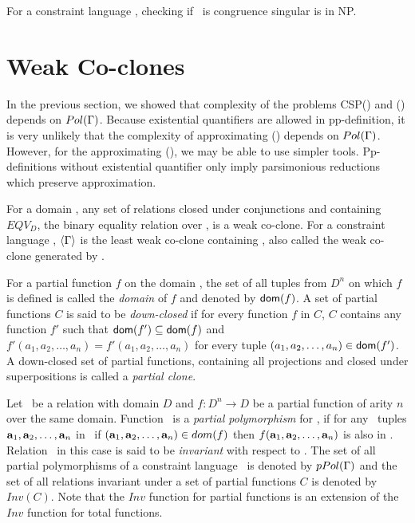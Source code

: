 \begin{theorem} 
For a constraint language \mrelset, checking if \mrelset\ is congruence singular is in NP.
\end{theorem}

\section{Weak Co-clones}
In the previous section, we showed that 
complexity of the problems CSP(\mrelset) and \ccsp(\mrelset) depends on \(Pol(\Gamma)\)\@.
Because existential quantifiers are allowed in pp-definition,
it is very unlikely that the complexity of approximating \ccsp(\mrelset) depends on \(Pol(\Gamma)\).
However, for the approximating \ccsp(\mrelset), we may be able to use
simpler tools. Pp-definitions without existential quantifier only imply
parsimonious reductions which preserve approximation.

For a domain \mD, any set of relations closed under conjunctions and
containing \(EQV_D\), the binary equality relation over \mD,
is a weak co-clone. For a constraint language \mrelset, 
\(\langle \Gamma \rangle\) is the least weak co-clone containing \mrelset,
also called the weak co-clone generated by \mrelset\@.

For a partial function \(f\) on the domain \mD,
the set of all tuples from \(D^n\) on which \(f\) is
defined is called the \emph{domain} of \(f\) and denoted by \({\sf dom}(f)\).
A set of partial functions \(C\) is said to be \emph{down-closed} if
for every function \(f\) in \(C\), \(C\) contains any function \(f'\) such that
\({\sf dom}(f')\subseteq{\sf dom}(f)\) and \(f'(a_1,a_2,\dotsc,a_n)=f'(a_1,a_2,\dotsc,a_n)\)
for every tuple \((a_1,a_2,\dotsc,a_n)\in {\sf dom}(f')\)\@.
A down-closed set of partial functions, 
containing all projections and closed under 
superpositions is called a \emph{partial clone}. 

Let \mR\ be a relation with domain \(D\) and \(f:D^n\to D\) be a partial function of arity \(n\)
over the same domain.
Function \mf\ is a \emph{partial polymorphism} for \mR,
if for any \mn\ tuples \(\textbf{a}_1,\textbf{a}_2,\dotsc,\textbf{a}_n\) in \mR\, 
if  \((\textbf{a}_1,\textbf{a}_2,\dotsc,\textbf{a}_n) \in dom(f)\) then 
\(f(\textbf{a}_1,\textbf{a}_2,\dotsc,\textbf{a}_n)\) is also in \mR\@. Relation \mR\ in this case is said to
be \emph{invariant} with respect to \mf\@.
The set of all partial polymorphisms of a constraint language \mrelset\ is denoted by
\(pPol(\Gamma)\) and the set of all relations invariant under a set of partial functions
\(C\) is denoted by \(Inv(C)\)\@. Note that the \(Inv\) function for partial functions is
an extension of the \(Inv\) function for total functions.

